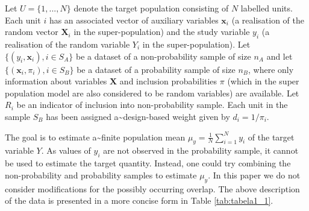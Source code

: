 \documentclass[
]{jss}
\begin{document}
Let \(U=\{1,..., N\}\) denote the target population consisting of \(N\)
labelled units. Each unit \(i\) has an associated vector of auxiliary
variables \(\boldsymbol{x}_{i}\) (a realisation of the random vector
\(\boldsymbol{X}_{i}\) in the super-population) and the study variable
\(y_{i}\) (a realisation of the random variable \(Y_{i}\) in the
super-population). Let \(\{ (y_i, \boldsymbol{x}_i), i \in S_A\}\) be a
dataset of a non-probability sample of size \(n_A\) and let
\(\{\left(\boldsymbol{x}_i, \pi_{i}\right), i \in S_B\}\) be a dataset
of a probability sample of size \(n_B\), where only information about
variables \(\boldsymbol{X}\) and inclusion probabilities \(\pi\) (which
in the super population model are also considered to be random
variables) are available. Let \(R_i\) be an indicator of inclusion into
non-probability sample. Each unit in the sample \(S_B\) has been
assigned a\textasciitilde design-based weight given by
\(d_i = 1/\pi_i\).

The goal is to estimate a\textasciitilde finite population mean
\(\displaystyle\mu_{y}=\frac{1}{N}\sum_{i=1}^{N} y_{i}\) of the target
variable \(Y\). As values of \(y_{i}\) are not observed in the
probability sample, it cannot be used to estimate the target quantity.
Instead, one could try combining the non-probability and probability
samples to estimate \(\mu_{y}\). In this paper we do not consider
modifications for the possibly occurring overlap. The above description
of the data is presented in a more concise form in Table
\ref{tab:tabela1_1}.
\end{document}
